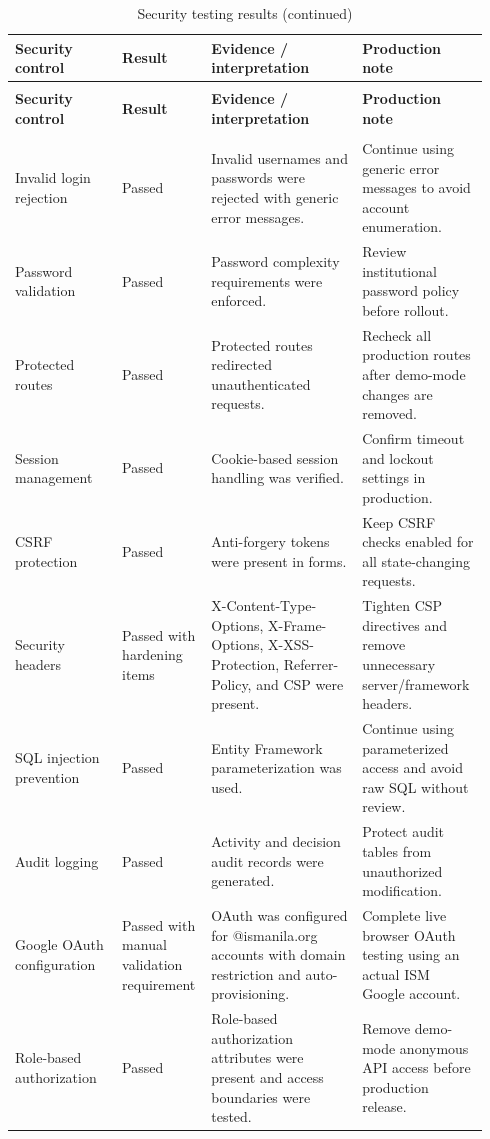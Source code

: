\begin{longtable}{>{\raggedright\arraybackslash}p{0.22\linewidth}
>{\raggedright\arraybackslash}p{0.15\linewidth}
>{\raggedright\arraybackslash}p{0.31\linewidth}
>{\raggedright\arraybackslash}p{0.26\linewidth}}
\caption{Security testing results}\label{table:security-results}\\
\toprule
\textbf{Security control} & \textbf{Result} & \textbf{Evidence / interpretation} & \textbf{Production note} \\
\midrule
\endfirsthead
\caption[]{Security testing results (continued)}\\
\toprule
\textbf{Security control} & \textbf{Result} & \textbf{Evidence / interpretation} & \textbf{Production note} \\
\midrule
\endhead
\midrule
\multicolumn{4}{r}{\textit{Continued on next page}}\\
\endfoot
\bottomrule
\endlastfoot
Invalid login rejection & Passed & Invalid usernames and passwords were rejected with generic error messages. & Continue using generic error messages to avoid account enumeration. \\
Password validation & Passed & Password complexity requirements were enforced. & Review institutional password policy before rollout. \\
Protected routes & Passed & Protected routes redirected unauthenticated requests. & Recheck all production routes after demo-mode changes are removed. \\
Session management & Passed & Cookie-based session handling was verified. & Confirm timeout and lockout settings in production. \\
CSRF protection & Passed & Anti-forgery tokens were present in forms. & Keep CSRF checks enabled for all state-changing requests. \\
Security headers & Passed with hardening items & X-Content-Type-Options, X-Frame-Options, X-XSS-Protection, Referrer-Policy, and CSP were present. & Tighten CSP directives and remove unnecessary server/framework headers. \\
SQL injection prevention & Passed & Entity Framework parameterization was used. & Continue using parameterized access and avoid raw SQL without review. \\
Audit logging & Passed & Activity and decision audit records were generated. & Protect audit tables from unauthorized modification. \\
Google OAuth configuration & Passed with manual validation requirement & OAuth was configured for @ismanila.org accounts with domain restriction and auto-provisioning. & Complete live browser OAuth testing using an actual ISM Google account. \\
Role-based authorization & Passed & Role-based authorization attributes were present and access boundaries were tested. & Remove demo-mode anonymous API access before production release. \\
\end{longtable}

